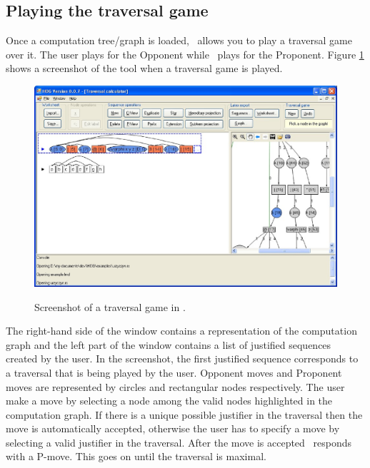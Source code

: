 \subsection{Playing the traversal game}

Once a computation tree/graph is loaded, \toolname\ allows you to play a traversal game over it. The user plays for the Opponent while \toolname\ plays for the Proponent. Figure \ref{fig:sshot_hog_traversal} shows a screenshot of the tool when a traversal game is played.
\begin{figure}
\begin{bigcenter}
  \includegraphics[width=15cm]{sshot_traversal}\\
\end{bigcenter}
  \caption{Screenshot of a traversal game in \toolname.}
  \label{fig:sshot_hog_traversal}
\end{figure}

The right-hand side of the window contains a representation of the computation graph and the left part of the window contains a list of justified sequences created by the user. In the screenshot, the first justified sequence corresponds to a traversal that is being played by the user. Opponent moves and Proponent moves are represented by circles and rectangular nodes respectively. The user make a move by selecting a node among the valid nodes highlighted in the computation graph. If there is a unique possible
 justifier in the traversal then the move is automatically
accepted, otherwise the user has to specify a move by selecting a valid justifier in the traversal. After the move is accepted \toolname\ responds with a P-move. This goes on until the traversal is maximal.

